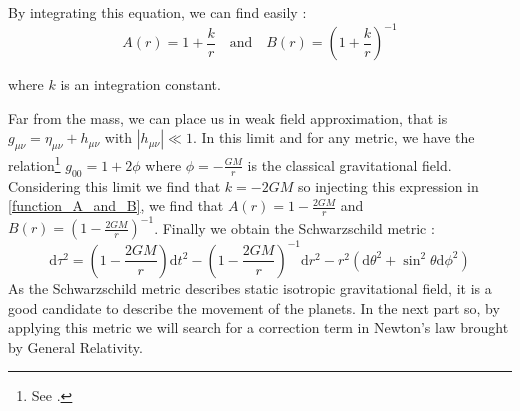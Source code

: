 By integrating this equation, we can find easily :
%
\begin{equation}\label{function_A_and_B}
	A\left(r\right) = 1 + \frac{k}{r} \quad \mathrm{and}
	\quad B\left(r\right) = \left(1+\frac{k}{r}\right)^{-1}
\end{equation}

where $k$ is an integration constant.

Far from the mass, we can place us in weak field approximation, that is $g_{\mu\nu} = \eta_{\mu\nu} + h_{\mu\nu}$ with $\left| h_{\mu\nu}\right| \ll 1$. In
this limit and for any metric, we have the relation\footnote{See \cite{weinberg1972gravitation}.} $g_{00} = 1 + 2\phi$ where $\phi = -\frac{GM}{r}$ is
the classical gravitational field.
Considering this limit we find that $k=-2GM$ so injecting this expression in \eqref{function_A_and_B}, we find that
$A(r) = 1 - \frac{2GM}{r}$ and $B(r) = \left( 1-\frac{2GM}{r}\right)^{-1}$. Finally we obtain the Schwarzschild metric :
%
\begin{equation}\label{schwa}
	\mathrm{d}\tau^2=\left(1-\frac{2GM}{r}\right)\mathrm{d}t^2
	-\left(1-\frac{2GM}{r}\right)^{-1}\mathrm{d}r^2-r^2\left(\mathrm{d}\theta ^2
	+\sin^2\theta \mathrm{d}\phi^2\right)
\end{equation}
%
As the Schwarzschild metric describes static isotropic
gravitational field, it is a good candidate to describe the movement of the planets. In the next part so, by
applying this metric we will search for a correction term in Newton's law brought by General Relativity.